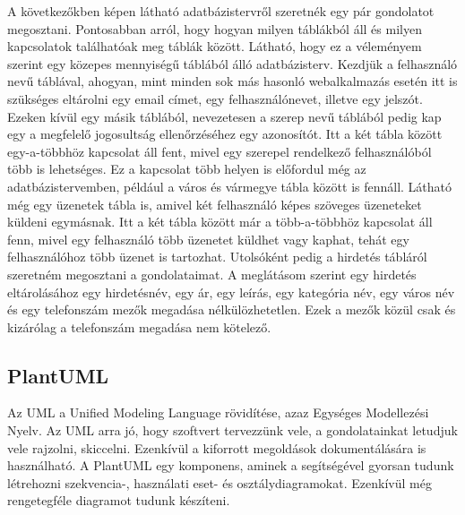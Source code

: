 \documentclass[]{thesis-ekf}
\theoremstyle{definition}
\theoremstyle{remark}
\begin{document}
	A következőkben  képen látható adatbázistervről szeretnék egy pár gondolatot megosztani. Pontosabban arról, hogy hogyan milyen táblákból áll és milyen kapcsolatok találhatóak meg táblák között. Látható, hogy ez a véleményem szerint egy közepes mennyiségű táblából álló adatbázisterv. Kezdjük a felhasználó nevű táblával, ahogyan, mint minden sok más hasonló webalkalmazás esetén itt is szükséges eltárolni egy email címet, egy felhasználónevet, illetve egy jelszót. Ezeken kívül egy másik táblából, nevezetesen a szerep nevű táblából pedig kap egy a megfelelő jogosultság ellenőrzéséhez egy azonosítót. Itt a két tábla között egy-a-többhöz kapcsolat áll fent, mivel egy szerepel rendelkező felhasználóból több is lehetséges. Ez a kapcsolat több helyen is előfordul még az adatbázistervemben, például a város és vármegye tábla között is fennáll. Látható még egy üzenetek tábla is, amivel két felhasználó képes szöveges üzeneteket küldeni egymásnak. Itt a két tábla között már a több-a-többhöz kapcsolat áll fenn, mivel egy felhasználó több üzenetet küldhet vagy kaphat, tehát egy felhasználóhoz több üzenet is tartozhat. Utolsóként pedig a hirdetés tábláról szeretném megosztani a gondolataimat. A meglátásom szerint egy hirdetés eltárolásához egy hirdetésnév, egy ár, egy leírás, egy kategória név, egy város név és egy telefonszám mezők megadása nélkülözhetetlen. Ezek a mezők közül csak és kizárólag a telefonszám megadása nem kötelező. 
	
	\subsection{PlantUML}\label{sc-plantuml}
	Az UML a Unified Modeling Language rövidítése, azaz Egységes Modellezési Nyelv. Az UML arra jó, hogy szoftvert tervezzünk vele, a gondolatainkat letudjuk vele rajzolni, skiccelni. Ezenkívül a kiforrott megoldások dokumentálására is használható. A PlantUML egy komponens, aminek a segítségével gyorsan tudunk létrehozni szekvencia-, használati eset- és osztálydiagramokat. Ezenkívül még rengetegféle diagramot tudunk készíteni. \cite{PlantUML}
	
\end{document}

